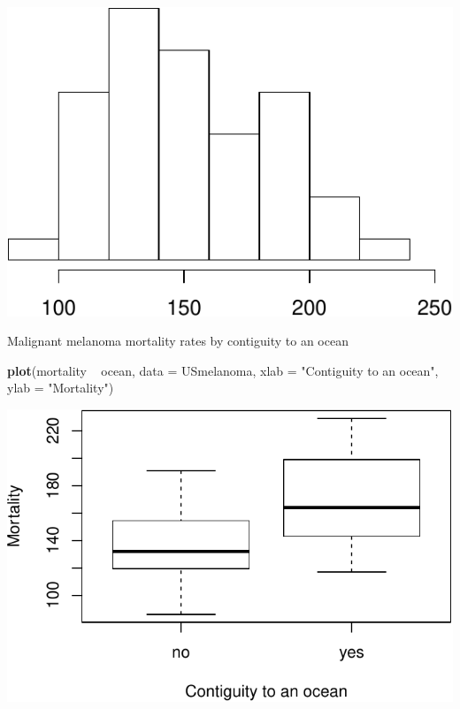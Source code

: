 \documentclass[]{article}
\newenvironment{Shaded}{\begin{snugshade}}{\end{snugshade}}
\newcommand{\KeywordTok}[1]{\textcolor[rgb]{0.13,0.29,0.53}{\textbf{{#1}}}}
\newcommand{\DataTypeTok}[1]{\textcolor[rgb]{0.13,0.29,0.53}{{#1}}}
\newcommand{\StringTok}[1]{\textcolor[rgb]{0.31,0.60,0.02}{{#1}}}
\newcommand{\NormalTok}[1]{{#1}}
\numberwithin{equation}{section}
\begin{document}
\begin{center}\includegraphics{tema1_files/figure-latex/unnamed-chunk-158-2} \end{center}

Malignant melanoma mortality rates by contiguity to an ocean

\begin{Shaded}
\begin{Highlighting}[]
\KeywordTok{plot}\NormalTok{(mortality ~}\StringTok{ }\NormalTok{ocean, }\DataTypeTok{data =} \NormalTok{USmelanoma, }\DataTypeTok{xlab =} \StringTok{"Contiguity to an ocean"}\NormalTok{, }\DataTypeTok{ylab =} \StringTok{"Mortality"}\NormalTok{)}
\end{Highlighting}
\end{Shaded}

\begin{center}\includegraphics{tema1_files/figure-latex/unnamed-chunk-159-1} \end{center}
\end{document}
